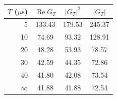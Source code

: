 \begin{tabular}{rccc}
\hline\hline
$T$ ($\mu\mathrm{s}$) & $\operatorname{Re}G_T$ & $|G_T|^2$ & $|G_T|$ \\
\hline
5 & 133.43 & 179.53 & 245.37 \\
10 & 74.69 & 93.32 & 128.91 \\
20 & 48.28 & 53.93 & 78.57 \\
30 & 42.59 & 44.35 & 72.86 \\
40 & 41.80 & 42.08 & 73.54 \\
$\infty$ & 41.88 & 41.88 & 72.54 \\
\hline\hline
\end{tabular}
